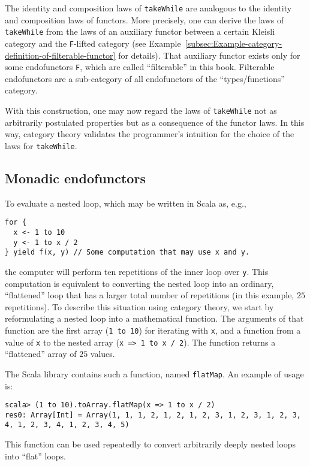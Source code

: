 The identity and composition laws of \lstinline!takeWhile! are analogous
to the identity and composition laws of functors. More precisely,
one can derive the laws of \lstinline!takeWhile! from the laws of
an auxiliary functor between a certain Kleisli category and the \lstinline!F!-lifted
category (see Example~\ref{subsec:Example-category-definition-of-filterable-functor}
for details). That auxiliary functor exists only for some endofunctors
\lstinline!F!, which are called \textsf{``}filterable\textsf{''} in this book. Filterable
endofunctors are a sub-category of all endofunctors of the \textsf{``}types/functions\textsf{''}
category. 

With this construction, one may now regard the laws of \lstinline!takeWhile!
not as arbitrarily postulated properties but as a consequence of the
functor laws. In this way, category theory validates the programmer\textsf{'}s
intuition for the choice of the laws for \lstinline!takeWhile!.

\subsection{Monadic endofunctors}

To evaluate a nested loop, which may be written in Scala as, e.g.,
\begin{lstlisting}
for {
  x <- 1 to 10
  y <- 1 to x / 2
} yield f(x, y) // Some computation that may use x and y.
\end{lstlisting}
the computer will perform ten repetitions of the inner loop over \lstinline!y!.
This computation is equivalent to converting the nested loop into
an ordinary, \textsf{``}flattened\textsf{''} loop that has a larger total number of
repetitions (in this example, $25$ repetitions). To describe this
situation using category theory, we start by reformulating a nested
loop into a mathematical function. The arguments of that function
are the first array (\lstinline!1 to 10!) for iterating with \lstinline!x!,
and a function from a value of \lstinline!x! to the nested array
(\lstinline!x => 1 to x / 2!). The function returns a \textsf{``}flattened\textsf{''}
array of $25$ values. 

The Scala library contains such a function, named \lstinline!flatMap!.
An example of usage is:
\begin{lstlisting}
scala> (1 to 10).toArray.flatMap(x => 1 to x / 2)
res0: Array[Int] = Array(1, 1, 1, 2, 1, 2, 1, 2, 3, 1, 2, 3, 1, 2, 3, 4, 1, 2, 3, 4, 1, 2, 3, 4, 5)
\end{lstlisting}
This function can be used repeatedly to convert arbitrarily deeply
nested loops into \textsf{``}flat\textsf{''} loops.

